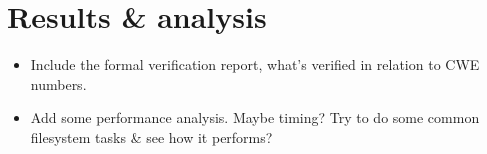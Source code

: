 \section{Results \& analysis}
\begin{itemize}
  \item Include the formal verification report, what's verified in relation to CWE numbers.
  \item Add some performance analysis. Maybe timing? Try to do some common filesystem tasks \& see how it performs?
\end{itemize}
